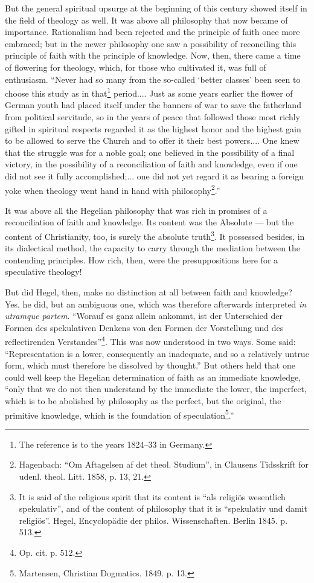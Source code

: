 \documentclass[12pt,a4paper]{book}
\newcommand{\opage}[1]{\marginnote{\footnotesize\textit{[#1]}}}
\begin{document}
But the general spiritual upsurge at the beginning of this century showed
itself in the field of theology as well. It was above all philosophy that now
became of importance. Rationalism had been rejected and the principle of faith
once more embraced; but in the newer philosophy one saw a possibility of
reconciling this principle of faith with the principle of knowledge. Now, then,
there came a time of flowering for theology, which, for those who
cultivated it, was full of enthusiasm. ``Never had so many from the so-called `better classes' been
seen to choose this study as in that\footnote{The reference is to the years
1824--33 in Germany.} period.... Just as some years earlier the flower of
German youth had placed itself under the banners of war to save the fatherland
from political servitude, so in the years of peace that followed those most
richly gifted in spiritual respects regarded it as the highest honor and the
highest gain to be allowed to serve the Church and to offer it their best
powers.... One knew that the struggle was for a noble goal; one believed in the
possibility of a final victory, in the possibility of a reconciliation of faith
and
\opage{15}\setcounter{footnote}{0}%
knowledge, even if one did not see it fully accomplished;... one did not yet
regard it as bearing a foreign yoke when theology went hand in hand with
philosophy\footnote{Hagenbach: ``Om Aftagelsen af det theol. Studium'', in
Clausens Tidsskrift for udenl. theol. Litt. 1858, p. 13, 21.}.''

It was above all the Hegelian philosophy that was rich in promises of a
reconciliation of faith and knowledge. Its content was the Absolute --- but
the content of Christianity, too, is surely the absolute truth\footnote{It is
said of the religious spirit that its content is ``als religiös wesentlich
spekulativ'', and of the content of philosophy that it is ``spekulativ und
damit religiös''. Hegel, Encyclopädie der philos. Wissenschaften. Berlin 1845.
p. 513.}. It possessed besides, in its dialectical method, the capacity to
carry through the mediation between the contending principles. How rich, then,
were the presuppositions here for a speculative theology!

But did Hegel, then, make no distinction at all between faith and knowledge?
Yes, he did, but an ambiguous one, which was therefore afterwards interpreted
\textit{in utramque partem}. ``Worauf es ganz allein ankommt, ist der
Unterschied der Formen des spekulativen Denkens von den Formen der Vorstellung
und des reflectirenden Verstandes''\footnote{Op. cit. p. 512.}. This was now
understood in two ways. Some said: ``Representation is a lower, consequently an
inadequate, and so a relatively untrue form, which must therefore be dissolved
by thought.'' But others held that one could well keep the Hegelian
determination of faith as an immediate knowledge, ``only that we do not then
understand by the immediate the lower, the imperfect, which is to be abolished
by philosophy as the perfect, but the original, the primitive knowledge, which
is the foundation of speculation\footnote{Martensen, Christian Dogmatics. 1849.
p. 13.}.''
\end{document}
